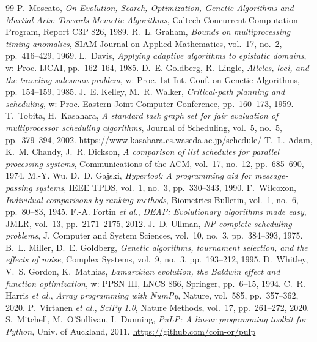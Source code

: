 \documentclass[12pt,a4paper]{article}
\begin{document}
\begin{thebibliography}{99}
 P.~Moscato, \textit{On Evolution, Search, Optimization, Genetic Algorithms and Martial Arts: Towards Memetic Algorithms}, Caltech Concurrent Computation Program, Report C3P 826, 1989.
 R.~L. Graham, \textit{Bounds on multiprocessing timing anomalies}, SIAM Journal on Applied Mathematics, vol.~17, no.~2, pp.~416--429, 1969.
 L.~Davis, \textit{Applying adaptive algorithms to epistatic domains}, w: Proc. IJCAI, pp.~162--164, 1985.
 D.~E. Goldberg, R.~Lingle, \textit{Alleles, loci, and the traveling salesman problem}, w: Proc. 1st Int. Conf. on Genetic Algorithms, pp.~154--159, 1985.
 J.~E. Kelley, M.~R. Walker, \textit{Critical-path planning and scheduling}, w: Proc. Eastern Joint Computer Conference, pp.~160--173, 1959.
 T.~Tobita, H.~Kasahara, \textit{A standard task graph set for fair evaluation of multiprocessor scheduling algorithms}, Journal of Scheduling, vol.~5, no.~5, pp.~379--394, 2002. \url{https://www.kasahara.cs.waseda.ac.jp/schedule/}
 T.~L. Adam, K.~M. Chandy, J.~R. Dickson, \textit{A comparison of list schedules for parallel processing systems}, Communications of the ACM, vol.~17, no.~12, pp.~685--690, 1974.
 M.-Y. Wu, D.~D. Gajski, \textit{Hypertool: A programming aid for message-passing systems}, IEEE TPDS, vol.~1, no.~3, pp.~330--343, 1990.
 F.~Wilcoxon, \textit{Individual comparisons by ranking methods}, Biometrics Bulletin, vol.~1, no.~6, pp.~80--83, 1945.
 F.-A. Fortin \textit{et al.}, \textit{DEAP: Evolutionary algorithms made easy}, JMLR, vol.~13, pp.~2171--2175, 2012.
 J.~D. Ullman, \textit{NP-complete scheduling problems}, J. Computer and System Sciences, vol.~10, no.~3, pp.~384--393, 1975.
 B.~L. Miller, D.~E. Goldberg, \textit{Genetic algorithms, tournament selection, and the effects of noise}, Complex Systems, vol.~9, no.~3, pp.~193--212, 1995.
 D.~Whitley, V.~S. Gordon, K.~Mathias, \textit{Lamarckian evolution, the Baldwin effect and function optimization}, w: PPSN III, LNCS 866, Springer, pp.~6--15, 1994.
 C.~R. Harris \textit{et al.}, \textit{Array programming with NumPy}, Nature, vol.~585, pp.~357--362, 2020.
 P.~Virtanen \textit{et al.}, \textit{SciPy 1.0}, Nature Methods, vol.~17, pp.~261--272, 2020.
 S.~Mitchell, M.~O'Sullivan, I.~Dunning, \textit{PuLP: A linear programming toolkit for Python}, Univ. of Auckland, 2011. \url{https://github.com/coin-or/pulp}
\end{thebibliography}
\end{document}
